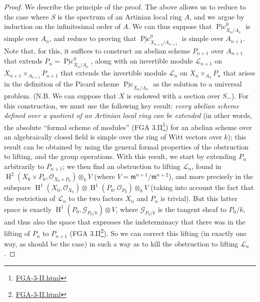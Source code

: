 \documentclass{article}
\renewcommand{\href}[2]{#2\footnote{\url{#1}}}
\newcommand{\oldpage}[1]{\marginpar{\footnotesize$\Big\vert$ \textit{p.~#1}}}
\theoremstyle{definition}
\theoremstyle{definition}
\theoremstyle{definition}
\theoremstyle{definition}
\theoremstyle{remark}
\begin{document}
\begin{proof}
We describe the principle of the proof.
The above allows us to reduce to the case where \(S\) is the spectrum of an Artinian local ring \(A\), and we argue by induction on the infinitesimal order of \(A\).
We can thus suppose that \(\underline{\operatorname{Pic}}_{X_n/A_n}^0\) is simple over \(A_n\), and reduce to proving that \(\underline{\operatorname{Pic}}_{X_{n+1}/A_{n+1}}^0\) is simple over \(A_{n+1}\).
Note that, for this, it suffices to construct an abelian scheme \(P_{n+1}\) over \(A_{n+1}\) that extends \(P_n=\underline{\operatorname{Pic}}_{X_n/A_n}^0\), along with an invertible module \({\mathscr{L}}_{n+1}\) on \(X_{n+1}\times_{A_{n+1}}P_{n+1}\) that extends the invertible module \({\mathscr{L}}_n\) on \(X_n\times_{A_n}P_n\) that arises in the definition of the Picard scheme \(\underline{\operatorname{Pic}}_{X_n/A_n}\) as the solution to a universal problem.
(N.B. We can suppose that \(X\) is endowed with a section over \(S\)\ldots).
For this construction, we must use the following key result: \emph{every abelian scheme defined over a quotient of an Artinian local ring can be extended} (in other words, the absolute ``formal scheme of modules'' (\href{FGA-3-II.html}{FGA 3.II}) for an abelian scheme over an algebraically closed field is simple over the ring of Witt vectors over \(k\));
\oldpage{236-20}this result can be obtained by using the general formal properties of the obstruction to lifting, and the group operations.
With this result, we start by extending \(P_n\) arbitrarily to \(P_{n+1}\);
we then find an obstruction to lifting \({\mathscr{L}}_n\), found in \(\operatorname{H}^2(X_0\times P_0,{\mathscr{O}}_{X_0\times P_0})\otimes_k V\) (where \(V={\mathfrak{m}}^{n+1}/{\mathfrak{m}}^{n+2}\)), and more precisely in the subspace \(\operatorname{H}^1(X_0,{\mathscr{O}}_{X_0})\otimes\operatorname{H}^1(P_0,{\mathscr{O}}_{P_0})\otimes_k V\) (taking into account the fact that the restriction of \({\mathscr{L}}_n\) to the two factors \(X_n\) and \(P_n\) is trivial).
But this latter space is exactly \(\operatorname{H}^1(P_0,{\mathscr{G}}_{P_0/k})\otimes V\), where \({\mathscr{G}}_{P_0/k}\) is the tangent sheaf to \(P_0/k\), and thus also the space that expresses the indeterminacy that there was in the lifting of \(P_n\) to \(P_{n+1}\) (\href{FGA-3-II.html}{FGA 3.II}).
So we can correct this lifting (in exactly one way, as should be the case) in such a way as to kill the obstruction to lifting \({\mathscr{L}}_n\).
\end{proof}
\end{document}
